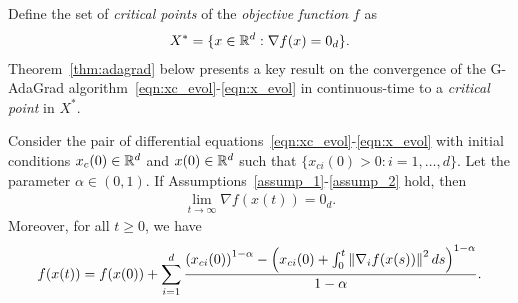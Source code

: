 Define the set of {\em critical points} of the {\em objective function} $f$ as
\begin{align}
    X^* = \{x\in \mathbb{R}^d : \nabla f(x) = 0_d\}. \label{eqn:xstar}
\end{align}
Theorem~\ref{thm:adagrad} below presents a key result on the convergence of the G-AdaGrad algorithm~\eqref{eqn:xc_evol}-\eqref{eqn:x_evol} in continuous-time to a {\em critical point} in $X^*$.

\begin{theorem} \label{thm:adagrad}
Consider the pair of differential equations~\eqref{eqn:xc_evol}-\eqref{eqn:x_evol} with initial conditions $x_c(0) \in \mathbb{R}^d$ and $x(0) \in \mathbb{R}^d$ such that $\{x_{ci}(0) > 0 : i = 1,\ldots,d\}$. Let the parameter $\alpha \in (0,1)$. If Assumptions~\ref{assump_1}-\ref{assump_2} hold, then
\begin{align}
    \lim_{t \to \infty} \nabla f(x(t)) = 0_d. \label{eqn:zero_grad_1}
\end{align}
Moreover, for all $t \geq 0$, we have
\begin{align}
   f(x(t)) = f(x(0)) + \sum_{i=1}^d \dfrac{\left(x_{ci}(0)\right)^{1-\alpha} - \left(x_{ci}(0) + \int_0^t \left\lVert\nabla_i f(x(s))\right\rVert ^2 ds\right)^{1-\alpha}}{1-\alpha}. \label{eqn:ft}
\end{align}
\end{theorem}

